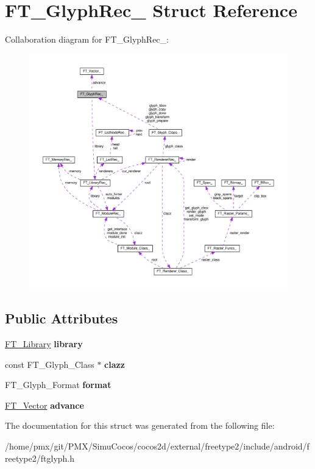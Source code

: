 \hypertarget{structFT__GlyphRec__}{}\section{F\+T\+\_\+\+Glyph\+Rec\+\_\+ Struct Reference}
\label{structFT__GlyphRec__}


Collaboration diagram for F\+T\+\_\+\+Glyph\+Rec\+\_\+\+:
\nopagebreak
\begin{figure}[H]
\begin{center}
\leavevmode
\includegraphics[width=350pt]{structFT__GlyphRec____coll__graph}
\end{center}
\end{figure}
\subsection*{Public Attributes}
\begin{DoxyCompactItemize}
\item 
\mbox{\label{structFT__GlyphRec___a00679b5e2519affab0f3999718817f8e}} 
\hyperlink{structFT__LibraryRec__}{F\+T\+\_\+\+Library} {\bfseries library}
\item 
\mbox{\label{structFT__GlyphRec___abfbabb27db0605068c42f4a397c6f689}} 
const F\+T\+\_\+\+Glyph\+\_\+\+Class $\ast$ {\bfseries clazz}
\item 
\mbox{\label{structFT__GlyphRec___a26b42a2610a69dcaed3e7c8b6d506211}} 
F\+T\+\_\+\+Glyph\+\_\+\+Format {\bfseries format}
\item 
\mbox{\label{structFT__GlyphRec___afd95b047df6a249db79018a279137018}} 
\hyperlink{structFT__Vector__}{F\+T\+\_\+\+Vector} {\bfseries advance}
\end{DoxyCompactItemize}


The documentation for this struct was generated from the following file\+:\begin{DoxyCompactItemize}
\item 
/home/pmx/git/\+P\+M\+X/\+Simu\+Cocos/cocos2d/external/freetype2/include/android/freetype2/ftglyph.\+h\end{DoxyCompactItemize}
